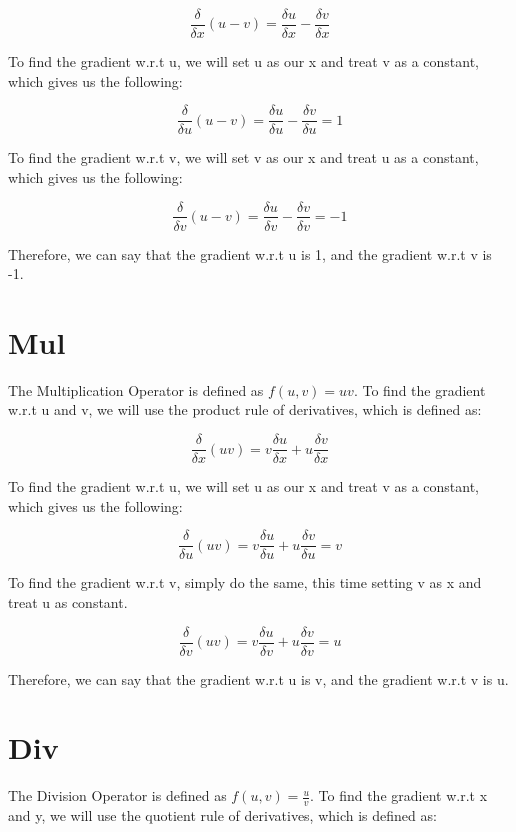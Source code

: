 \documentclass{report}
\begin{document}
            $$\frac{\delta}{\delta{x}}(u - v) = \frac{\delta{u}}{\delta{x}} - \frac{\delta{v}}{\delta{x}}$$
        
            To find the gradient w.r.t u, we will set u as our x and treat v as a constant, 
            which gives us the following:
        
            $$\frac{\delta}{\delta{u}}(u - v) = \frac{\delta{u}}{\delta{u}} - \frac{\delta{v}}{\delta{u}} = 1$$
        
            To find the gradient w.r.t v, we will set v as our x and treat u as a constant, 
            which gives us the following:
        
            $$\frac{\delta}{\delta{v}}(u - v) = \frac{\delta{u}}{\delta{v}} - \frac{\delta{v}}{\delta{v}} = -1$$
        
            Therefore, we can say that the gradient w.r.t u is 1, and the gradient w.r.t v is -1. 

        \section{Mul}
            The Multiplication Operator is defined as $f(u, v) = uv$. To find the gradient w.r.t 
            u and v, we will use the product rule of derivatives, which is defined as:

            $$\frac{\delta}{\delta{x}}(uv) = v\frac{\delta{u}}{\delta{x}} + u\frac{\delta{v}}{\delta{x}}$$

            To find the gradient w.r.t u, we will set u as our x and treat v as a constant, 
            which gives us the following:

            $$\frac{\delta}{\delta{u}}(uv) = v\frac{\delta{u}}{\delta{u}} + u\frac{\delta{v}}{\delta{u}} = v$$

            To find the gradient w.r.t v, simply do the same, this time setting v as x and treat u as constant.

            $$\frac{\delta}{\delta{v}}(uv) = v\frac{\delta{u}}{\delta{v}} + u\frac{\delta{v}}{\delta{v}} = u$$

            Therefore, we can say that the gradient w.r.t u is v, and the gradient w.r.t v is u. 

        \section{Div}
            The Division Operator is defined as $f(u, v) = \frac{u}{v}$. To find the gradient w.r.t x and y, we will
            use the quotient rule of derivatives, which is defined as:
    
\end{document}
